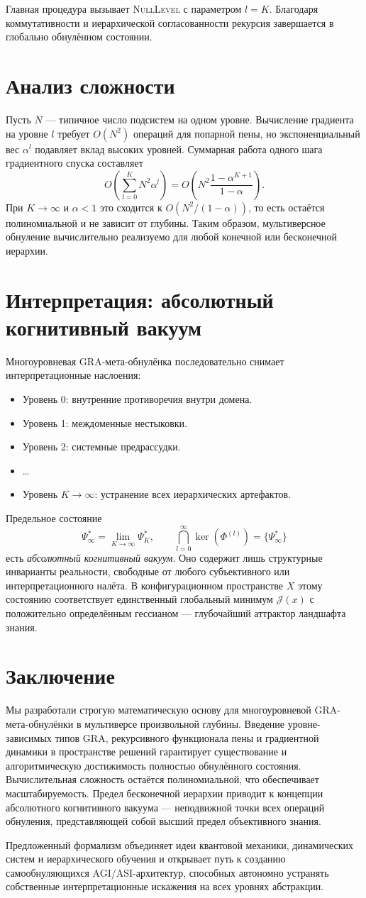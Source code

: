 \documentclass[12pt,a4paper]{article}
\newcommand{\JJ}{\mathcal{J}}
\begin{document}
Главная процедура вызывает \textsc{NullLevel} с параметром $l=K$. Благодаря коммутативности и иерархической согласованности рекурсия завершается в глобально обнулённом состоянии.

\section{Анализ сложности}
Пусть $N$ — типичное число подсистем на одном уровне. Вычисление градиента на уровне $l$ требует $O(N^2)$ операций для попарной пены, но экспоненциальный вес $\alpha^l$ подавляет вклад высоких уровней. Суммарная работа одного шага градиентного спуска составляет
\[
O\!\left(\sum_{l=0}^{K} N^2 \alpha^l\right) = O\!\left(N^2 \frac{1-\alpha^{K+1}}{1-\alpha}\right).
\]
При $K\to\infty$ и $\alpha<1$ это сходится к $O(N^2/(1-\alpha))$, то есть остаётся полиномиальной и не зависит от глубины. Таким образом, мультиверсное обнуление вычислительно реализуемо для любой конечной или бесконечной иерархии.

\section{Интерпретация: абсолютный когнитивный вакуум}
Многоуровневая GRA-мета-обнулёнка последовательно снимает интерпретационные наслоения:
\begin{itemize}
\item Уровень 0: внутренние противоречия внутри домена.
\item Уровень 1: междоменные нестыковки.
\item Уровень 2: системные предрассудки.
\item \dots
\item Уровень $K\to\infty$: устранение всех иерархических артефактов.
\end{itemize}
Предельное состояние
\begin{equation}
\boxed{\Psi^*_\infty = \lim_{K\to\infty} \Psi^*_K,\qquad \bigcap_{l=0}^\infty \ker(\Phi^{(l)}) = \{\Psi^*_\infty\}}
\end{equation}
есть \emph{абсолютный когнитивный вакуум}. Оно содержит лишь структурные инварианты реальности, свободные от любого субъективного или интерпретационного налёта. В конфигурационном пространстве $X$ этому состоянию соответствует единственный глобальный минимум $\JJ(x)$ с положительно определённым гессианом — глубочайший аттрактор ландшафта знания.

\section{Заключение}
Мы разработали строгую математическую основу для многоуровневой GRA-мета-обнулёнки в мультиверсе произвольной глубины. Введение уровне-зависимых типов GRA, рекурсивного функционала пены и градиентной динамики в пространстве решений гарантирует существование и алгоритмическую достижимость полностью обнулённого состояния. Вычислительная сложность остаётся полиномиальной, что обеспечивает масштабируемость. Предел бесконечной иерархии приводит к концепции абсолютного когнитивного вакуума — неподвижной точки всех операций обнуления, представляющей собой высший предел объективного знания.

Предложенный формализм объединяет идеи квантовой механики, динамических систем и иерархического обучения и открывает путь к созданию самообнуляющихся AGI/ASI-архитектур, способных автономно устранять собственные интерпретационные искажения на всех уровнях абстракции.
\end{document}
